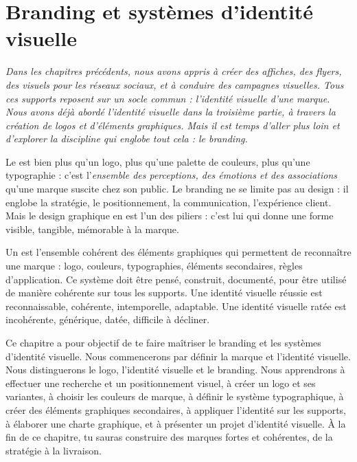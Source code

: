 
\chapter{Branding et systèmes d'identité visuelle}

\noindent
\textit{Dans les chapitres précédents, nous avons appris à créer des affiches, des flyers, des visuels pour les réseaux sociaux, et à conduire des campagnes visuelles. Tous ces supports reposent sur un socle commun : l'\emph{identité visuelle} d'une marque. Nous avons déjà abordé l'identité visuelle dans la troisième partie, à travers la création de logos et d'éléments graphiques. Mais il est temps d'aller plus loin et d'explorer la discipline qui englobe tout cela : le \emph{branding}.}

\vspace{1em}

\noindent
Le  est bien plus qu'un logo, plus qu'une palette de couleurs, plus qu'une typographie : c'est l'\emph{ensemble des perceptions, des émotions et des associations} qu'une marque suscite chez son public. Le branding ne se limite pas au design : il englobe la stratégie, le positionnement, la communication, l'expérience client. Mais le design graphique en est l'un des piliers : c'est lui qui donne une forme visible, tangible, mémorable à la marque.

\vspace{1em}

\noindent
Un  est l'ensemble cohérent des éléments graphiques qui permettent de reconnaître une marque : logo, couleurs, typographies, éléments secondaires, règles d'application. Ce système doit être pensé, construit, documenté, pour être utilisé de manière cohérente sur tous les supports. Une identité visuelle réussie est reconnaissable, cohérente, intemporelle, adaptable. Une identité visuelle ratée est incohérente, générique, datée, difficile à décliner.

\vspace{1em}

\noindent
Ce chapitre a pour objectif de te faire maîtriser le branding et les systèmes d'identité visuelle. Nous commencerons par définir la marque et l'identité visuelle. Nous distinguerons le logo, l'identité visuelle et le branding. Nous apprendrons à effectuer une recherche et un positionnement visuel, à créer un logo et ses variantes, à choisir les couleurs de marque, à définir le système typographique, à créer des éléments graphiques secondaires, à appliquer l'identité sur les supports, à élaborer une charte graphique, et à présenter un projet d'identité visuelle. À la fin de ce chapitre, tu sauras construire des marques fortes et cohérentes, de la stratégie à la livraison.

